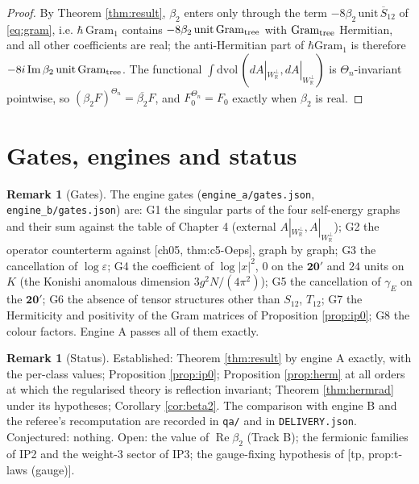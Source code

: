 \documentclass[11pt]{article}
\theoremstyle{plain}
\theoremstyle{definition}
\newtheorem{remark}[theorem]{Remark}
\numberwithin{equation}{section}
\newcommand{\Wp}{W_{\mathbb R}^\perp}
\newcommand{\Gt}{\mathrm{Gram}_{\rm tree}}
\newcommand{\Go}{\mathrm{Gram}_1}
\begin{document}
\begin{proof}
By Theorem \ref{thm:result}, $\beta_2$ enters only through the term $-8\beta_2\,\mathrm{unit}\,\overline S_{12}$ of \eqref{eq:gram}, i.e. $\hbar\,\Go$ contains $-8\beta_2\,\mathrm{unit}\,\Gt$ with $\Gt$ Hermitian, and all other coefficients are real; the anti-Hermitian part of $\hbar\Go$ is therefore $-8i\operatorname{Im}\beta_2\,\mathrm{unit}\,\Gt$. The functional $\int\mathrm{dvol}\,(dA|_{\Wp},dA|_{\Wp})$ is $\Theta_n$-invariant pointwise, so $(\beta_2F)^{\Theta_n}=\overline{\beta_2}F$, and $F_0^{\Theta_n}=F_0$ exactly when $\beta_2$ is real.
\end{proof}

\section{Gates, engines and status}

\begin{remark}[Gates]
The engine gates (\texttt{engine\_a/gates.json}, \texttt{engine\_b/gates.json}) are: G1 the singular parts of the four self-energy graphs and their sum against the table of Chapter 4 (external $A|_{\Wp},A|_{\Wp}$); G2 the operator counterterm against [ch05, thm:c5-Oeps], graph by graph; G3 the cancellation of $\log\varepsilon$; G4 the coefficient of $\log|x|^2$, $0$ on the $\mathbf{20'}$ and $24$ units on $K$ (the Konishi anomalous dimension $3g^2N/(4\pi^2)$); G5 the cancellation of $\gamma_E$ on the $\mathbf{20'}$; G6 the absence of tensor structures other than $S_{12}$, $T_{12}$; G7 the Hermiticity and positivity of the Gram matrices of Proposition \ref{prop:ip0}; G8 the colour factors. Engine A passes all of them exactly.
\end{remark}

\begin{remark}[Status]
Established: Theorem \ref{thm:result} by engine A exactly, with the per-class values; Proposition \ref{prop:ip0}; Proposition \ref{prop:herm} at all orders at which the regularised theory is reflection invariant; Theorem \ref{thm:hermrad} under its hypotheses; Corollary \ref{cor:beta2}. The comparison with engine B and the referee's recomputation are recorded in \texttt{qa/} and in \texttt{DELIVERY.json}. Conjectured: nothing. Open: the value of $\operatorname{Re}\beta_2$ (Track B); the fermionic families of IP2 and the weight-3 sector of IP3; the gauge-fixing hypothesis of [tp, prop:t-laws (gauge)].
\end{remark}
\end{document}
